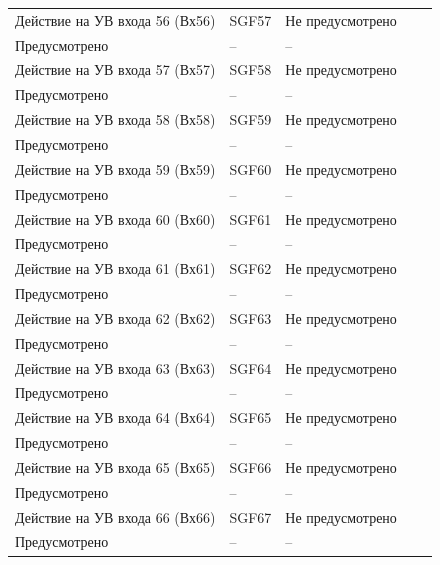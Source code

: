 \begin{longtable}{|>{\centering\arraybackslash}m{5.3cm}|>{\centering\arraybackslash}m{3.3cm}|>{\centering\arraybackslash}m{4.2cm}|>{\centering\arraybackslash}m{1.8cm}|>{\centering\arraybackslash}m{1cm}|}
\hline
\centering Действие на УВ входа 56 (Вх56)  & \centering SGF57 & \centering Не предусмотрено \\ Предусмотрено & \centering -- & \centering \arraybackslash -- \\
\hline
\centering Действие на УВ входа 57 (Вх57)  & \centering SGF58 & \centering Не предусмотрено \\ Предусмотрено & \centering -- & \centering \arraybackslash -- \\
\hline
\centering Действие на УВ входа 58 (Вх58)  & \centering SGF59 & \centering Не предусмотрено \\ Предусмотрено & \centering -- & \centering \arraybackslash -- \\
\hline
\centering Действие на УВ входа 59 (Вх59)  & \centering SGF60 & \centering Не предусмотрено \\ Предусмотрено & \centering -- & \centering \arraybackslash -- \\
\hline
\centering Действие на УВ входа 60 (Вх60)  & \centering SGF61 & \centering Не предусмотрено \\ Предусмотрено & \centering -- & \centering \arraybackslash -- \\
\hline
\centering Действие на УВ входа 61 (Вх61)  & \centering SGF62 & \centering Не предусмотрено \\ Предусмотрено & \centering -- & \centering \arraybackslash -- \\
\hline
\centering Действие на УВ входа 62 (Вх62)  & \centering SGF63 & \centering Не предусмотрено \\ Предусмотрено & \centering -- & \centering \arraybackslash -- \\
\hline
\centering Действие на УВ входа 63 (Вх63)  & \centering SGF64 & \centering Не предусмотрено \\ Предусмотрено & \centering -- & \centering \arraybackslash -- \\
\hline
\centering Действие на УВ входа 64 (Вх64)  & \centering SGF65 & \centering Не предусмотрено \\ Предусмотрено & \centering -- & \centering \arraybackslash -- \\
\hline
\centering Действие на УВ входа 65 (Вх65)  & \centering SGF66 & \centering Не предусмотрено \\ Предусмотрено & \centering -- & \centering \arraybackslash -- \\
\hline
\centering Действие на УВ входа 66 (Вх66)  & \centering SGF67 & \centering Не предусмотрено \\ Предусмотрено & \centering -- & \centering \arraybackslash -- \\

\end{longtable}
